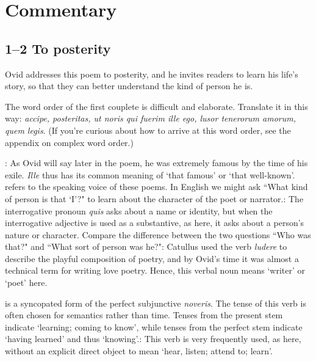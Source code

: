 \chapter*{Commentary}

\section*{1--2 To posterity}

Ovid addresses this poem to posterity, and he invites readers to learn his
life's story, so that they can better understand the kind of person he is.


The word order of the first couplete is difficult and elaborate.  Translate it
in this way: \textit{accipe, posteritas, ut noris qui fuerim ille ego, lusor
tenerorum amorum, quem legis}.  (If you're curious about how to arrive at this
word order, see the appendix on complex word order.)


: As Ovid will say later in the poem, he was extremely famous by the
time of his exile.  \textit{Ille} thus has its common meaning of `that famous'
or `that well-known'.\indent{} refers to the speaking voice of these
poems.  In English we might ask ``What kind of person is that `I'?" to learn
about the character of the poet or narrator.\indent{}: The interrogative
pronoun \textit{quis} asks about a name or identity, but when the interrogative
adjective is used as a substantive, as here, it asks about a person's nature or
character.  Compare the difference between the two questions ``Who was that?"
and ``What sort of person was he?"\indent{}: Catullus used the verb
\textit{ludere} to describe the playful composition of poetry, and by Ovid's
time it was almost a technical term for writing love poetry.  Hence, this
verbal noun means `writer' or `poet' here.


 is a syncopated form of the perfect subjunctive \textit{noveris}.
The tense of this verb is often chosen for semantics rather than time. Tenses
from the present stem indicate `learning; coming to know', while tenses from
the perfect stem indicate `having learned' and thus
`knowing'.\indent{}: This verb is very frequently used, as here,
without an explicit direct object to mean `hear, listen; attend to; learn'.

